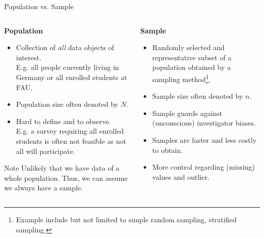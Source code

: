 \begin{frame}{Population vs. Sample}
  \begin{columns}[t]
    \begin{column}{0.5\columnwidth}
      \centering \textbf{Population}
      \begin{itemize}
      \item Collection of \textit{all} data objects of interest.\\ E.g. all
        people currently living in Germany or all enrolled students at FAU.
      \item Population size often denoted by $N$.
      \item Hard to define and to observe.\\E.g. a survey requiring all enrolled
        students is often not feasible as not all will participate.
      \end{itemize}
      \begin{alertblock}{Note}
        Unlikely that we have data of a whole population. Thus, we can assume we
        always have a sample.
      \end{alertblock}
    \end{column}
    \begin{column}{0.5\columnwidth}
      \centering \textbf{Sample}
      \begin{itemize}
      \item Randomly selected and representative subset of a population obtained
        by a sampling method\footnote[frame]{Example include but not limited to
          simple random sampling, stratified sampling.}.
      \item Sample size often denoted by $n$.
      \item Sample guards against (unconscious) investigator biases.
      \item Samples are faster and less costly to obtain.
      \item More control regarding (missing) values and outlier.
      \end{itemize}
    \end{column}
  \end{columns}
\end{frame}

